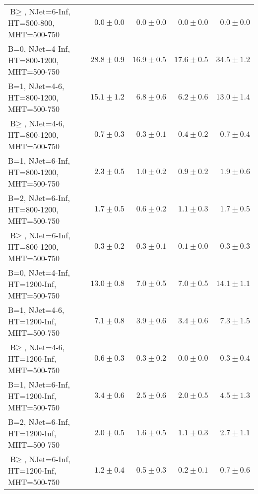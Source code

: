 \begin{table}
\begin{tabular}{l|r|r|r|r}
    $\text{B}\geq$, NJet=6-Inf, HT=500-800, MHT=500-750 &               $0.0\pm0.0$&               $0.0\pm0.0$&               $0.0\pm0.0$&                   $0.0\pm0.0$ \\ 
    B=0, NJet=4-Inf, HT=800-1200, MHT=500-750 &              $28.8\pm0.9$&              $16.9\pm0.5$&              $17.6\pm0.5$&                  $34.5\pm1.2$ \\ 
    B=1, NJet=4-6, HT=800-1200, MHT=500-750 &              $15.1\pm1.2$&               $6.8\pm0.6$&               $6.2\pm0.6$&                  $13.0\pm1.4$ \\ 
    $\text{B}\geq$, NJet=4-6, HT=800-1200, MHT=500-750 &               $0.7\pm0.3$&               $0.3\pm0.1$&               $0.4\pm0.2$&                   $0.7\pm0.4$ \\ 
    B=1, NJet=6-Inf, HT=800-1200, MHT=500-750 &               $2.3\pm0.5$&               $1.0\pm0.2$&               $0.9\pm0.2$&                   $1.9\pm0.6$ \\ 
    B=2, NJet=6-Inf, HT=800-1200, MHT=500-750 &               $1.7\pm0.5$&               $0.6\pm0.2$&               $1.1\pm0.3$&                   $1.7\pm0.5$ \\ 
    $\text{B}\geq$, NJet=6-Inf, HT=800-1200, MHT=500-750 &               $0.3\pm0.2$&               $0.3\pm0.1$&               $0.1\pm0.0$&                   $0.3\pm0.3$ \\ 
    B=0, NJet=4-Inf, HT=1200-Inf, MHT=500-750 &              $13.0\pm0.8$&               $7.0\pm0.5$&               $7.0\pm0.5$&                  $14.1\pm1.1$ \\ 
    B=1, NJet=4-6, HT=1200-Inf, MHT=500-750 &               $7.1\pm0.8$&               $3.9\pm0.6$&               $3.4\pm0.6$&                   $7.3\pm1.5$ \\ 
    $\text{B}\geq$, NJet=4-6, HT=1200-Inf, MHT=500-750 &               $0.6\pm0.3$&               $0.3\pm0.2$&               $0.0\pm0.0$&                   $0.3\pm0.4$ \\ 
    B=1, NJet=6-Inf, HT=1200-Inf, MHT=500-750 &               $3.4\pm0.6$&               $2.5\pm0.6$&               $2.0\pm0.5$&                   $4.5\pm1.3$ \\ 
    B=2, NJet=6-Inf, HT=1200-Inf, MHT=500-750 &               $2.0\pm0.5$&               $1.6\pm0.5$&               $1.1\pm0.3$&                   $2.7\pm1.1$ \\ 
    $\text{B}\geq$, NJet=6-Inf, HT=1200-Inf, MHT=500-750 &               $1.2\pm0.4$&               $0.5\pm0.3$&               $0.2\pm0.1$&                   $0.7\pm0.6$ \\ 

\end{tabular}
\end{table}
